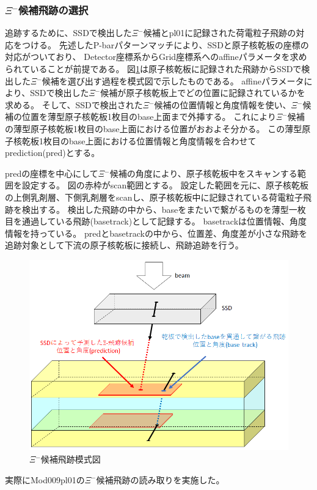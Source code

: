 \documentclass[12pt,a4paper]{jarticle}
\begin{document}
\subsubsection{$\Xi$$^-$候補飛跡の選択}\label{pl01_track}
追跡するために、SSDで検出した$\Xi$$^-$候補とpl01に記録された荷電粒子飛跡の対応をつける。
先述したP-barパターンマッチにより、SSDと原子核乾板の座標の対応がついており、
Detector座標系からGrid座標系へのaffineパラメータを求められていることが前提である。
図\ref{fig:pl01_mosikizu}は原子核乾板に記録された飛跡からSSDで検出した$\Xi$$^-$候補を選び出す過程を模式図で示したものである。
affineパラメータにより、SSDで検出した$\Xi$$^-$候補が原子核乾板上でどの位置に記録されているかを求める。
そして、SSDで検出された$\Xi$$^-$候補の位置情報と角度情報を使い、$\Xi$$^-$候補の位置を薄型原子核乾板1枚目のbase上面まで外挿する。
これにより$\Xi$$^-$候補の薄型原子核乾板1枚目のbase上面における位置がおおよそ分かる。
この薄型原子核乾板1枚目のbase上面における位置情報と角度情報を合わせてprediction(pred)とする。
\par
predの座標を中心にして$\Xi$$^-$候補の角度により、原子核乾板中をスキャンする範囲を設定する。
図の赤枠がscan範囲とする。
設定した範囲を元に、原子核乾板の上側乳剤層、下側乳剤層をscanし、原子核乾板中に記録されている荷電粒子飛跡を検出する。
検出した飛跡の中から、baseをまたいで繋がるものを薄型一枚目を通過している飛跡(basetrack)として記録する。
basetrackは位置情報、角度情報を持っている。
predとbasetrackの中から、位置差、角度差が小さな飛跡を追跡対象として下流の原子核乾板に接続し、飛跡追跡を行う。
\begin{figure}[htbp]
  \centering
     \includegraphics[width=140mm]{pl01_mosikizu.png}
  \caption{$\Xi$$^-$候補飛跡模式図\label{fig:pl01_mosikizu}}
\end{figure}
\newpage
\par
実際にMod009pl01の$\Xi$$^-$候補飛跡の読み取りを実施した。
\end{document}
